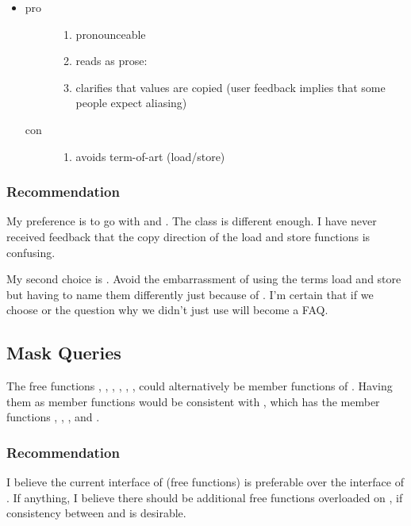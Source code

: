 \begin{itemize}
  \item {}
    \begin{description}
      \item[pro]
        \begin{enumerate}
          \item pronounceable
          \item reads as prose: 
          \item clarifies that values are copied
            (user feedback implies that some people expect aliasing)
        \end{enumerate}
      \item[con]
        \begin{enumerate}
          \item avoids term-of-art (load/store)
        \end{enumerate}
    \end{description}

\end{itemize}

\subsubsection{Recommendation}
My preference is to go with  and .
The  class is different enough.
I have never received feedback that the copy direction of the load and store functions is confusing.

My second choice is .
Avoid the embarrassment of using the terms load and store but having to name them differently just because of .
I'm certain that if we choose  or  the question why we didn't just use  will become a FAQ.

\subsection{Mask Queries}\label{sec:mask queries}
The free functions , , , , , ,  could alternatively be member functions of \mask.
Having them as member functions would be consistent with , which has the member functions , , , and .

\subsubsection{Recommendation}
I believe the current interface of \mask (free functions) is preferable over the interface of .
If anything, I believe there should be additional free functions overloaded on , if consistency between \mask and  is desirable.

